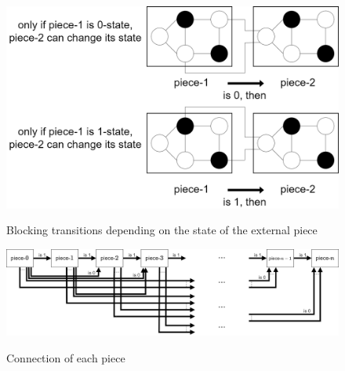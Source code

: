 \documentclass[dvipdfmx,autodetect-engine]{article}
\begin{document}
\begin{figure}[b]
  \begin{center}
    \caption{Blocking transitions depending on the state of the external piece}
    \includegraphics[scale=0.2]{transitionif.png}
    \label{lednum}
  \end{center} 
\end{figure}


\begin{figure}[b]
  \begin{center}
    \caption{Connection of each piece}
    \includegraphics[scale=0.2]{chain.png}
    \label{lednum}
  \end{center} 
\end{figure}
\end{document}
